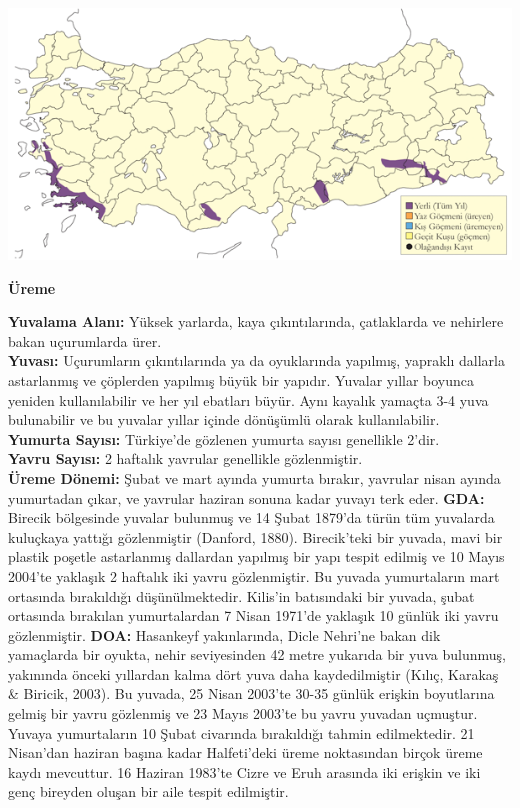 \documentclass[
  a4paper,
  DIV=11,
  numbers=noendperiod]{scrreprt}
\begin{document}
\includegraphics{images/harita_Page_097.png}

\textbf{Üreme}

\textbf{Yuvalama Alanı:} Yüksek yarlarda, kaya çıkıntılarında,
çatlaklarda ve nehirlere bakan uçurumlarda ürer.\\
\textbf{Yuvası:} Uçurumların çıkıntılarında ya da oyuklarında yapılmış,
yapraklı dallarla astarlanmış ve çöplerden yapılmış büyük bir yapıdır.
Yuvalar yıllar boyunca yeniden kullanılabilir ve her yıl ebatları büyür.
Aynı kayalık yamaçta 3-4 yuva bulunabilir ve bu yuvalar yıllar içinde
dönüşümlü olarak kullanılabilir.\\
\textbf{Yumurta Sayısı:} Türkiye'de gözlenen yumurta sayısı genellikle
2'dir.\\
\textbf{Yavru Sayısı:} 2 haftalık yavrular genellikle gözlenmiştir.\\
\textbf{Üreme Dönemi:} Şubat ve mart ayında yumurta bırakır, yavrular
nisan ayında yumurtadan çıkar, ve yavrular haziran sonuna kadar yuvayı
terk eder. \textbf{GDA:} Birecik bölgesinde yuvalar bulunmuş ve 14 Şubat
1879'da türün tüm yuvalarda kuluçkaya yattığı gözlenmiştir (Danford,
1880). Birecik'teki bir yuvada, mavi bir plastik poşetle astarlanmış
dallardan yapılmış bir yapı tespit edilmiş ve 10 Mayıs 2004'te yaklaşık
2 haftalık iki yavru gözlenmiştir. Bu yuvada yumurtaların mart ortasında
bırakıldığı düşünülmektedir. Kilis'in batısındaki bir yuvada, şubat
ortasında bırakılan yumurtalardan 7 Nisan 1971'de yaklaşık 10 günlük iki
yavru gözlenmiştir. \textbf{DOA:} Hasankeyf yakınlarında, Dicle Nehri'ne
bakan dik yamaçlarda bir oyukta, nehir seviyesinden 42 metre yukarıda
bir yuva bulunmuş, yakınında önceki yıllardan kalma dört yuva daha
kaydedilmiştir (Kılıç, Karakaş \& Biricik, 2003). Bu yuvada, 25 Nisan
2003'te 30-35 günlük erişkin boyutlarına gelmiş bir yavru gözlenmiş ve
23 Mayıs 2003'te bu yavru yuvadan uçmuştur. Yuvaya yumurtaların 10 Şubat
civarında bırakıldığı tahmin edilmektedir. 21 Nisan'dan haziran başına
kadar Halfeti'deki üreme noktasından birçok üreme kaydı mevcuttur. 16
Haziran 1983'te Cizre ve Eruh arasında iki erişkin ve iki genç bireyden
oluşan bir aile tespit edilmiştir.
\end{document}
